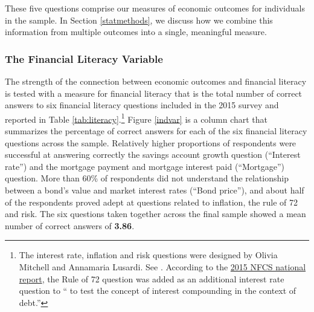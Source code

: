 \documentclass[12pt]{article}
\theoremstyle{plain}
\begin{document}
These five questions comprise our measures of economic outcomes for individuals in the sample.  In Section \ref{statmethods}, we discuss how we combine this information from multiple outcomes into a single, meaningful measure. 

\subsubsection{The Financial Literacy Variable}

The strength of the connection between economic outcomes and financial literacy is tested with a measure for financial literacy that is the total number of correct answers to six financial literacy questions included in the 2015 survey and reported in Table \ref{tab:literacy}.\footnote{The interest rate, inflation and risk questions were designed by Olivia Mitchell and Annamaria Lusardi.  See \cite{lusardi2014economic}.  According to the \href{http://www.usfinancialcapability.org/downloads/NFCS\_2015\_Report\_Natl\_Findings.pdf}{2015 NFCS national report}, the Rule of 72 question was added as an additional interest rate question to `` to test the concept of interest compounding in the context of debt.''} Figure \ref{indvar} is a column chart that summarizes the percentage of correct answers for each of the six financial literacy questions across the sample.  Relatively higher proportions of respondents were successful at answering correctly the savings account growth question (``Interest rate'') and the mortgage payment and mortgage interest paid (``Mortgage'') question.  More than 60\% of respondents did not understand the relationship between a bond's value and market interest rates (``Bond price''), and about half of the respondents proved adept at questions related to inflation, the rule of 72 and risk. The six questions taken together across the final sample showed a  mean number of correct answers of \textbf{3.86}.  
\end{document}
